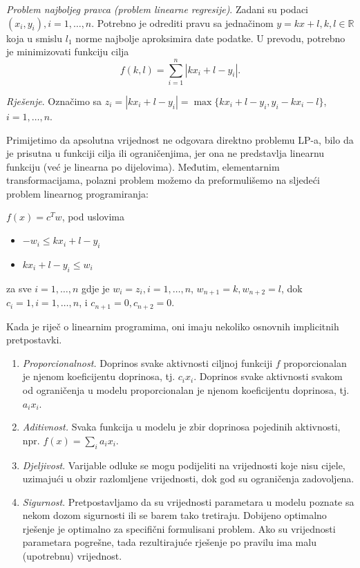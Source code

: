\documentclass[a4paper, utf8, 11pt, colorlinks]{book}
\begin{document}
\emph{Problem najboljeg pravca (problem linearne regresije)}. Zadani su podaci $(x_i, y_i), i = 1, \ldots , n$. Potrebno je odrediti pravu sa jednačinom $y = k x + l,
k, l \in \mathbb{R}$ koja u smislu $l_1$ norme najbolje aproksimira date podatke. U prevodu, potrebno je minimizovati  funkciju cilja $$f(k, l) = \sum_{i=1}^n |k x_i + l - y_i|.$$

\emph{Rješenje}.
Označimo sa $z_i = |k x_i + l - y_i| = \max\{k x_i + l - y_i, y_i - k x_i - l \}$, $i=1,\ldots,n$. 

Primijetimo da apsolutna vrijednost ne odgovara direktno problemu LP-a, bilo da je prisutna u funkciji cilja ili ograničenjima, jer ona ne predstavlja linearnu funkciju (već je  linearna po dijelovima). Međutim, elementarnim transformacijama, polazni problem možemo da preformulišemo na sljedeći  problem linearnog programiranja: %

$f(x) = c^T w$, pod uslovima
\begin{itemize}
    \item $ -w_i \leq k x_i + l - y_i$ 
    \item $ k x_i + l - y_i \leq w_i $
\end{itemize}
za sve $i = 1, \ldots, n$ gdje je 
$w_i = z_i, i=1,\ldots,n$, $w_{n+1} = k, w_{n+2} = l$, dok 
$c_i = 1, i=1,\ldots,n$, i $c_{n+1} = 0, c_{n+2} = 0$. 



 
Kada je riječ o linearnim programima,  oni imaju nekoliko osnovnih implicitnih pretpostavki. 
\begin{enumerate}
    \item \emph{Proporcionalnost.} Doprinos svake aktivnosti ciljnoj funkciji $f$ proporcionalan je njenom koeficijentu doprinosa, tj. $c_ix_i$. Doprinos svake aktivnosti svakom od  ograničenja u modelu proporcionalan je njenom  koeficijentu doprinosa, tj. $a_ix_i$.
    \item  \emph{Aditivnost.} Svaka funkcija u modelu je zbir  doprinosa pojedinih aktivnosti, npr. $f(x) = \sum_i a_i x_i$.
    \item \emph{Djeljivost}. Varijable odluke se mogu podijeliti na vrijednosti koje nisu cijele, uzimajući u obzir  razlomljene vrijednosti, dok god su ograničenja zadovoljena.  
    \item \emph{Sigurnost}. Pretpostavljamo da su vrijednosti parametara u modelu poznate
    sa nekom dozom sigurnosti ili se barem tako tretiraju. Dobijeno optimalno rješenje je optimalno za specifični formulisani problem. Ako su vrijednosti parametara pogrešne, tada rezultirajuće rješenje po pravilu ima malu (upotrebnu)  vrijednost.  
\end{enumerate}
\end{document}
